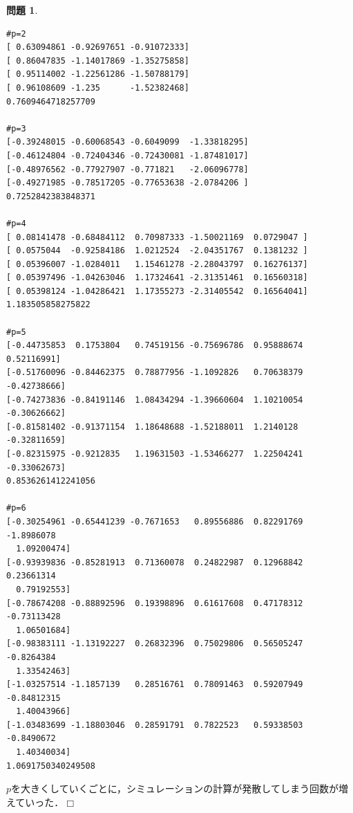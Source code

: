 \documentclass[titlepage]{jsarticle}
\theoremstyle{definition}
\newtheorem{Ex}{問題}
\theoremstyle{mystyle} %
\renewcommand{\footnotesize}{\normalsize}
\def\qed{\hfill$\Box$}
\begin{document}
\begin{Ex}
\begin{lstlisting}[basicstyle = \ttfamily\footnotesize, frame = single]
#p=2
[ 0.63094861 -0.92697651 -0.91072333]
[ 0.86047835 -1.14017869 -1.35275858]
[ 0.95114002 -1.22561286 -1.50788179]
[ 0.96108609 -1.235      -1.52382468]
0.7609464718257709

#p=3
[-0.39248015 -0.60068543 -0.6049099  -1.33818295]
[-0.46124804 -0.72404346 -0.72430081 -1.87481017]
[-0.48976562 -0.77927907 -0.771821   -2.06096778]
[-0.49271985 -0.78517205 -0.77653638 -2.0784206 ]
0.7252842383848371

#p=4
[ 0.08141478 -0.68484112  0.70987333 -1.50021169  0.0729047 ]
[ 0.0575044  -0.92584186  1.0212524  -2.04351767  0.1381232 ]
[ 0.05396007 -1.0284011   1.15461278 -2.28043797  0.16276137]
[ 0.05397496 -1.04263046  1.17324641 -2.31351461  0.16560318]
[ 0.05398124 -1.04286421  1.17355273 -2.31405542  0.16564041]
1.183505858275822

#p=5
[-0.44735853  0.1753804   0.74519156 -0.75696786  0.95888674  0.52116991]
[-0.51760096 -0.84462375  0.78877956 -1.1092826   0.70638379 -0.42738666]
[-0.74273836 -0.84191146  1.08434294 -1.39660604  1.10210054 -0.30626662]
[-0.81581402 -0.91371154  1.18648688 -1.52188011  1.2140128  -0.32811659]
[-0.82315975 -0.9212835   1.19631503 -1.53466277  1.22504241 -0.33062673]
0.8536261412241056

#p=6
[-0.30254961 -0.65441239 -0.7671653   0.89556886  0.82291769 -1.8986078
  1.09200474]
[-0.93939836 -0.85281913  0.71360078  0.24822987  0.12968842  0.23661314
  0.79192553]
[-0.78674208 -0.88892596  0.19398896  0.61617608  0.47178312 -0.73113428
  1.06501684]
[-0.98383111 -1.13192227  0.26832396  0.75029806  0.56505247 -0.8264384
  1.33542463]
[-1.03257514 -1.1857139   0.28516761  0.78091463  0.59207949 -0.84812315
  1.40043966]
[-1.03483699 -1.18803046  0.28591791  0.7822523   0.59338503 -0.8490672
  1.40340034]
1.0691750340249508
\end{lstlisting}
$p$を大きくしていくごとに，シミュレーションの計算が発散してしまう回数が増えていった．\qed\\
\end{Ex}
\end{document}
